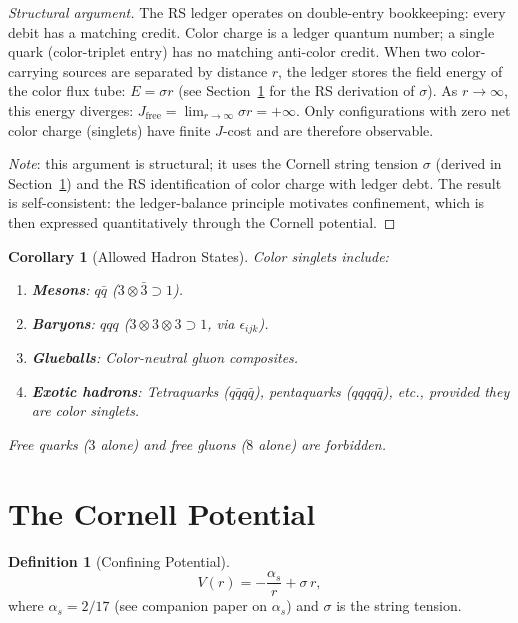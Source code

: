 \documentclass[12pt,a4paper]{article}
\newtheorem{corollary}[theorem]{Corollary}
\theoremstyle{definition}
\newtheorem{definition}[theorem]{Definition}
\theoremstyle{remark}
\begin{document}
\begin{proof}[Structural argument]
The RS ledger operates on double-entry bookkeeping: every debit
has a matching credit.  Color charge is a ledger quantum number;
a single quark (color-triplet entry) has no matching anti-color
credit.  When two color-carrying sources are separated by distance
$r$, the ledger stores the field energy of the color flux tube:
$E = \sigma r$ (see Section~\ref{sec:potential} for the RS
derivation of $\sigma$).  As $r \to \infty$, this energy diverges:
$J_\mathrm{free} = \lim_{r\to\infty}\sigma r = +\infty$.
Only configurations with zero net color charge (singlets) have
finite $J$-cost and are therefore observable.

\emph{Note}: this argument is structural; it uses the Cornell string tension
$\sigma$ (derived in Section~\ref{sec:potential}) and the RS
identification of color charge with ledger debt.  The result is
self-consistent: the ledger-balance principle motivates confinement,
which is then expressed quantitatively through the Cornell potential.
\end{proof}

\begin{corollary}[Allowed Hadron States]
Color singlets include:
\begin{enumerate}[label=(\roman*)]
  \item \textbf{Mesons}: $q\bar{q}$
  ($3 \otimes \bar{3} \supset 1$).
  \item \textbf{Baryons}: $qqq$
  ($3 \otimes 3 \otimes 3 \supset 1$, via $\epsilon_{ijk}$).
  \item \textbf{Glueballs}: Color-neutral gluon composites.
  \item \textbf{Exotic hadrons}: Tetraquarks ($q\bar{q}q\bar{q}$),
  pentaquarks ($qqqq\bar{q}$), etc., provided they are color
  singlets.
\end{enumerate}
Free quarks ($3$ alone) and free gluons ($8$ alone) are forbidden.
\end{corollary}

\section{The Cornell Potential}
\label{sec:potential}

\begin{definition}[Confining Potential]
\begin{equation}
  V(r) = -\frac{\alpha_s}{r} + \sigma\,r,
\end{equation}
where $\alpha_s = 2/17$ (see companion paper on $\alpha_s$) and
$\sigma$ is the string tension.
\end{definition}
\end{document}

